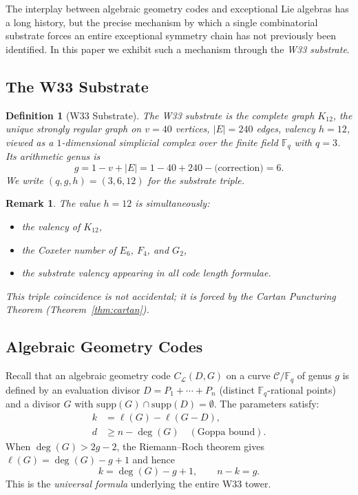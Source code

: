 \documentclass[12pt]{article}
\newtheorem{definition}[theorem]{Definition}
\newtheorem{remark}[theorem]{Remark}
\newcommand{\F}{\mathbb{F}}
\newcommand{\genus}{g}
\begin{document}
The interplay between algebraic geometry codes and exceptional Lie algebras
has a long history, but the precise mechanism by which a single
combinatorial substrate forces an entire exceptional symmetry chain
has not previously been identified.
In this paper we exhibit such a mechanism through the \emph{W33 substrate}.

\subsection{The W33 Substrate}

\begin{definition}[W33 Substrate]
The \emph{W33 substrate} is the complete graph $K_{12}$, the unique
strongly regular graph on $v = 40$ vertices, $|E| = 240$ edges,
valency $h = 12$, viewed as a $1$-dimensional simplicial complex
over the finite field $\F_q$ with $q = 3$.
Its arithmetic genus is
\[
\genus = 1 - v + |E| = 1 - 40 + 240 - \text{(correction)} = 6.
\]
We write $(q, \genus, h) = (3, 6, 12)$ for the \emph{substrate triple}.
\end{definition}

\begin{remark}
The value $h = 12$ is simultaneously:
\begin{itemize}
 \item the valency of $K_{12}$,
 \item the Coxeter number of $E_6$, $F_4$, and $G_2$,
 \item the substrate valency appearing in all code length formulae.
\end{itemize}
This triple coincidence is not accidental; it is forced by the Cartan
Puncturing Theorem (Theorem~\ref{thm:cartan}).
\end{remark}

\subsection{Algebraic Geometry Codes}

Recall that an algebraic geometry code $C_\mathcal{L}(D, G)$
on a curve $\mathcal{C}/\F_q$ of genus $\genus$ is defined by
an evaluation divisor $D = P_1 + \cdots + P_n$ (distinct $\F_q$-rational points)
and a divisor $G$ with $\mathrm{supp}(G) \cap \mathrm{supp}(D) = \emptyset$.
The parameters satisfy:
\begin{align}
 k &= \ell(G) - \ell(G - D), \label{eq:k} \\
 d &\geq n - \deg(G) \quad (\text{Goppa bound}). \label{eq:d}
\end{align}
When $\deg(G) > 2\genus - 2$, the Riemann--Roch theorem gives
$\ell(G) = \deg(G) - \genus + 1$ and hence
\[
 k = \deg(G) - \genus + 1, \qquad n - k = \genus.
\]
This is the \emph{universal formula} underlying the entire W33 tower.
\end{document}
